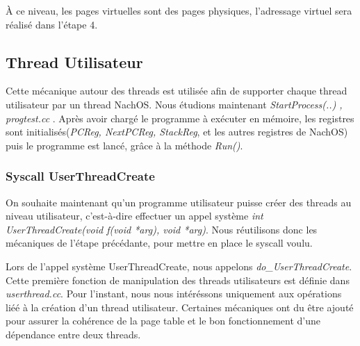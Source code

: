 \documentclass[a4paper,10pt]{article}
\begin{document}
À ce niveau, les pages virtuelles sont des pages physiques, l'adressage virtuel sera réalisé dans l'étape 4.

\newpage
\subsection{Thread Utilisateur}
Cette mécanique autour des threads est utilisée afin de supporter chaque thread utilisateur par un thread NachOS.
Nous étudions maintenant \textit{StartProcess(..) , progtest.cc }. Après avoir chargé le programme à exécuter en mémoire,
les registres sont initialisés(\textit{PCReg, NextPCReg, StackReg}, et les autres registres de NachOS) puis le programme est lancé, grâce à la méthode \textit{Run()}.
\subsubsection{Syscall UserThreadCreate}
On souhaite maintenant qu’un programme utilisateur puisse créer des threads au niveau utilisateur,
c’est-à-dire effectuer un appel système \textit{int UserThreadCreate(void f(void *arg), void *arg)}.
Nous réutilisons donc les mécaniques de l'étape précédante, pour mettre en place le syscall voulu.

Lors de l'appel système UserThreadCreate, nous appelons \textit{do\_UserThreadCreate}.
Cette première fonction de manipulation des threads utilisateurs est définie dans \textit{userthread.cc}.
Pour l'instant, nous nous intéréssons uniquement aux opérations liéé à la création d'un thread utilisateur.
Certaines mécaniques ont du être ajouté pour assurer la cohérence de la page table et le bon fonctionnement d'une dépendance
entre deux threads.
\end{document}
